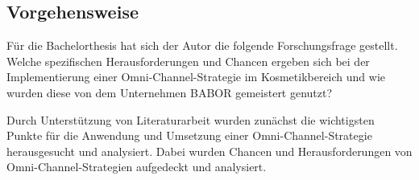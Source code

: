 \subsection{Vorgehensweise}\label{vorgehensweise}
Für die Bachelorthesis hat sich der Autor die folgende Forschungsfrage gestellt.
\newline
Welche spezifischen Herausforderungen und Chancen ergeben sich bei der Implementierung einer Omni-Channel-Strategie im Kosmetikbereich und wie wurden diese von dem Unternehmen BABOR gemeistert  genutzt?
\newline

Durch Unterstützung von Literaturarbeit wurden zunächst die wichtigsten Punkte für die Anwendung und Umsetzung einer Omni-Channel-Strategie herausgesucht und analysiert. Dabei wurden Chancen und Herausforderungen von Omni-Channel-Strategien aufgedeckt und analysiert.